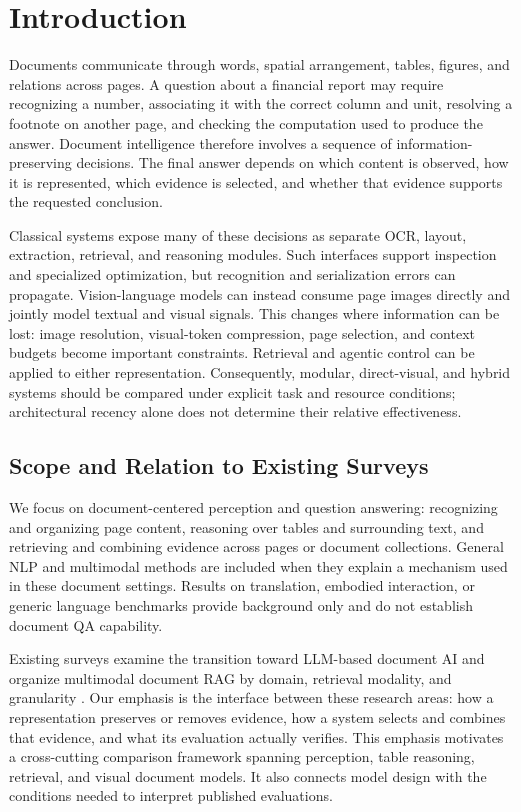 \section{Introduction}

Documents communicate through words, spatial arrangement, tables, figures, and relations across pages. A question about a financial report may require recognizing a number, associating it with the correct column and unit, resolving a footnote on another page, and checking the computation used to produce the answer. Document intelligence therefore involves a sequence of information-preserving decisions. The final answer depends on which content is observed, how it is represented, which evidence is selected, and whether that evidence supports the requested conclusion.

Classical systems expose many of these decisions as separate OCR, layout, extraction, retrieval, and reasoning modules. Such interfaces support inspection and specialized optimization, but recognition and serialization errors can propagate. Vision-language models can instead consume page images directly and jointly model textual and visual signals. This changes where information can be lost: image resolution, visual-token compression, page selection, and context budgets become important constraints. Retrieval and agentic control can be applied to either representation. Consequently, modular, direct-visual, and hybrid systems should be compared under explicit task and resource conditions; architectural recency alone does not determine their relative effectiveness.

\subsection{Scope and Relation to Existing Surveys}

We focus on document-centered perception and question answering: recognizing and organizing page content, reasoning over tables and surrounding text, and retrieving and combining evidence across pages or document collections. General NLP and multimodal methods are included when they explain a mechanism used in these document settings. Results on translation, embodied interaction, or generic language benchmarks provide background only and do not establish document QA capability.

Existing surveys examine the transition toward LLM-based document AI \cite{wang2025documentintelligencesurvey} and organize multimodal document RAG by domain, retrieval modality, and granularity \cite{gao2025scalingbeyondcontext}. Our emphasis is the interface between these research areas: how a representation preserves or removes evidence, how a system selects and combines that evidence, and what its evaluation actually verifies. This emphasis motivates a cross-cutting comparison framework spanning perception, table reasoning, retrieval, and visual document models. It also connects model design with the conditions needed to interpret published evaluations.

